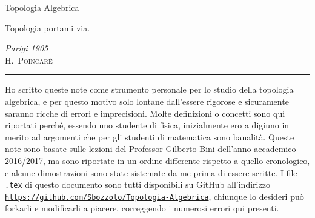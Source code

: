 \documentclass[10pt, twoside=false, x11names]{scrbook}
\begin{document}
\begin{titlepage}

  \noindent
  \titlefont Topologia Algebrica
  \epigraph{Topologia portami via.}%
  {\textit{Parigi 1905}\\ \textsc{H.\ Poincarè}}
  \null\vfill
  \vspace*{1cm}
  \noindent
  \hfill
  \begin{minipage}{0.35\linewidth}
    \begin{flushright}
      \printauthor
    \end{flushright}
  \end{minipage}
  \begin{minipage}{0.02\linewidth}
    \rule{1pt}{125pt}
  \end{minipage}
  \titlepagedecoration
\end{titlepage}


\vspace*{150pt}

Ho scritto queste note come strumento personale per lo studio
della topologia algebrica, e per questo motivo solo lontane dall'essere rigorose
e sicuramente saranno ricche di errori e imprecisioni. Molte definizioni o
concetti sono qui riportati perché, essendo uno studente di fisica, inizialmente
ero a digiuno in merito ad argomenti che per gli studenti di matematica sono
banalità. Queste note sono basate sulle lezioni del Professor Gilberto Bini
dell'anno accademico 2016/2017, ma sono riportate in un ordine differente
rispetto a quello cronologico, e alcune dimostrazioni sono state sistemate da me
prima di essere scritte. I file {\small \texttt{.tex} }di questo documento sono
tutti disponibili su GitHub all'indirizzo
\href{https://github.com/Sbozzolo/Topologia-Algebrica}{\small
  \texttt{https://github.com/Sbozzolo/Topologia-Algebrica}}, chiunque lo
desideri può forkarli e modificarli a piacere, correggendo i numerosi errori qui
presenti.
\\ \\
{
}
\end{document}
